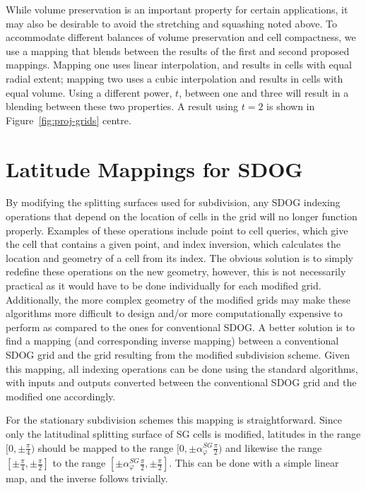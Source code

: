 While volume preservation is an important property for certain applications, it may also be desirable to avoid the stretching and squashing noted above.
To accommodate different balances of volume preservation and cell compactness, we use a mapping that blends between the results of the first and second proposed mappings.
Mapping one uses linear interpolation, and results in cells with equal radial extent; mapping two uses a cubic interpolation and results in cells with equal volume.
Using a different power, $t$, between one and three will result in a blending between these two properties.
A result using $t=2$ is shown in Figure~\ref{fig:proj-grids} centre.


\section{Latitude Mappings for SDOG}

By modifying the splitting surfaces used for subdivision, any SDOG indexing operations that depend on the location of cells in the grid will no longer function properly.
Examples of these operations include point to cell queries, which give the cell that contains a given point, and index inversion, which calculates the location and geometry of a cell from its index.
The obvious solution is to simply redefine these operations on the new geometry, however, this is not necessarily practical as it would have to be done individually for each modified grid.
Additionally, the more complex geometry of the modified grids may make these algorithms more difficult to design and/or more computationally expensive to perform as compared to the ones for conventional SDOG.
A better solution is to find a mapping (and corresponding inverse mapping) between a conventional SDOG grid and the grid resulting from the modified subdivision scheme.
Given this mapping, all indexing operations can be done using the standard algorithms, with inputs and outputs converted between the conventional SDOG grid and the modified one accordingly.


For the stationary subdivision schemes this mapping is straightforward.
Since only the latitudinal splitting surface of SG cells is modified, latitudes in the range $[0, \pm\frac{\pi}{4})$ should be mapped to the range $[0, \pm\alpha_{\varphi}^{SG} \frac{\pi}{2})$ and likewise the range $[\pm\frac{\pi}{4}, \pm\frac{\pi}{2}]$ to the range $[\pm\alpha_{\varphi}^{SG} \frac{\pi}{2}, \pm\frac{\pi}{2}]$.
This can be done with a simple linear map, and the inverse follows trivially.


